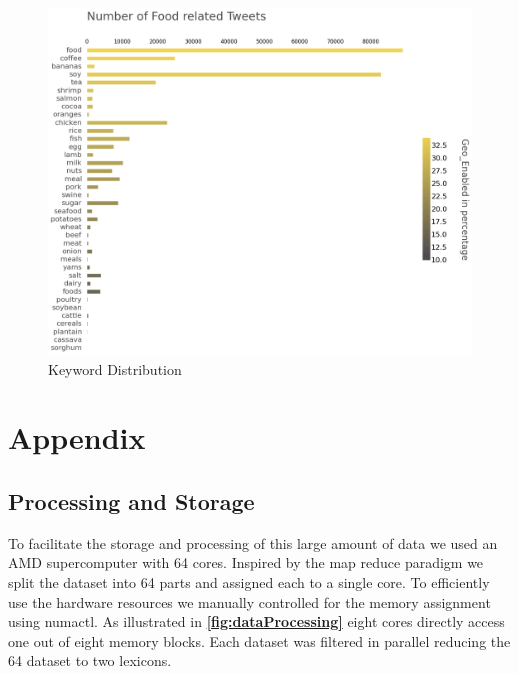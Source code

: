 \documentclass[12pt]{report}
\begin{document}
  \begin{figure}[H]
\centerline{ \noindent\includegraphics[width=1\textwidth]{img/anal/n_food_tweets}}
 \caption{Keyword Distribution}
 \label{fig:keywordDistribution}
\end{figure}
 


%
%

\cleardoublepage
{}
{}






\cleardoublepage
{}
\chapter*{Appendix}

\section{Processing and Storage}

 To facilitate the storage and processing of this large amount of data we used an AMD supercomputer with 64 cores. Inspired by the  map reduce paradigm we split the dataset into 64 parts and assigned each to a single core. To efficiently use the hardware resources we manually controlled for the memory assignment using numactl. As illustrated in\textbf{ \ref{fig:dataProcessing}} eight cores directly access one out of eight memory blocks. Each dataset was filtered in parallel reducing the 64 dataset to two lexicons. 
\end{document}
